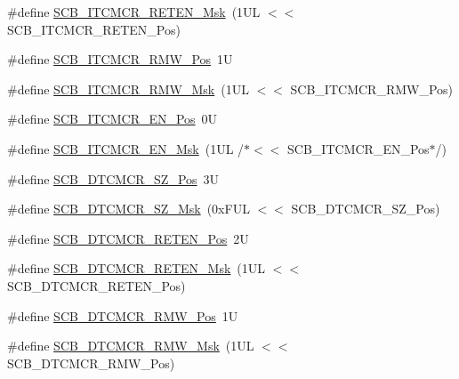 \begin{DoxyCompactItemize}
\item 
\#define \hyperlink{group___c_m_s_i_s___s_c_b_ga6f7d14ca4c78b7fd64157d9f8110f188}{S\-C\-B\-\_\-\-I\-T\-C\-M\-C\-R\-\_\-\-R\-E\-T\-E\-N\-\_\-\-Msk}~(1\-U\-L $<$$<$ S\-C\-B\-\_\-\-I\-T\-C\-M\-C\-R\-\_\-\-R\-E\-T\-E\-N\-\_\-\-Pos)
\item 
\#define \hyperlink{group___c_m_s_i_s___s_c_b_ga33901f7f35fe403c82a9641a0d35ae92}{S\-C\-B\-\_\-\-I\-T\-C\-M\-C\-R\-\_\-\-R\-M\-W\-\_\-\-Pos}~1\-U
\item 
\#define \hyperlink{group___c_m_s_i_s___s_c_b_ga0e3b9b0855837e95e4b0fc6d36cd604b}{S\-C\-B\-\_\-\-I\-T\-C\-M\-C\-R\-\_\-\-R\-M\-W\-\_\-\-Msk}~(1\-U\-L $<$$<$ S\-C\-B\-\_\-\-I\-T\-C\-M\-C\-R\-\_\-\-R\-M\-W\-\_\-\-Pos)
\item 
\#define \hyperlink{group___c_m_s_i_s___s_c_b_ga5d2fc7c04a8aaedff19bd4ff6de187eb}{S\-C\-B\-\_\-\-I\-T\-C\-M\-C\-R\-\_\-\-E\-N\-\_\-\-Pos}~0\-U
\item 
\#define \hyperlink{group___c_m_s_i_s___s_c_b_ga4d1c57f26a03910ab0549efecd2a602c}{S\-C\-B\-\_\-\-I\-T\-C\-M\-C\-R\-\_\-\-E\-N\-\_\-\-Msk}~(1\-U\-L /$\ast$$<$$<$ S\-C\-B\-\_\-\-I\-T\-C\-M\-C\-R\-\_\-\-E\-N\-\_\-\-Pos$\ast$/)
\item 
\#define \hyperlink{group___c_m_s_i_s___s_c_b_ga3cacd7498eb3c022ecc7e21a3dfc3c13}{S\-C\-B\-\_\-\-D\-T\-C\-M\-C\-R\-\_\-\-S\-Z\-\_\-\-Pos}~3\-U
\item 
\#define \hyperlink{group___c_m_s_i_s___s_c_b_ga35b381dd367cd1533f5c2b2c88720b72}{S\-C\-B\-\_\-\-D\-T\-C\-M\-C\-R\-\_\-\-S\-Z\-\_\-\-Msk}~(0x\-F\-U\-L $<$$<$ S\-C\-B\-\_\-\-D\-T\-C\-M\-C\-R\-\_\-\-S\-Z\-\_\-\-Pos)
\item 
\#define \hyperlink{group___c_m_s_i_s___s_c_b_ga8b72fb208ee772734e580911a8e522ce}{S\-C\-B\-\_\-\-D\-T\-C\-M\-C\-R\-\_\-\-R\-E\-T\-E\-N\-\_\-\-Pos}~2\-U
\item 
\#define \hyperlink{group___c_m_s_i_s___s_c_b_gaa69bbf5b17808383d88f23a424c1b62e}{S\-C\-B\-\_\-\-D\-T\-C\-M\-C\-R\-\_\-\-R\-E\-T\-E\-N\-\_\-\-Msk}~(1\-U\-L $<$$<$ S\-C\-B\-\_\-\-D\-T\-C\-M\-C\-R\-\_\-\-R\-E\-T\-E\-N\-\_\-\-Pos)
\item 
\#define \hyperlink{group___c_m_s_i_s___s_c_b_ga11c115ca21511be7e56e997a8bde567a}{S\-C\-B\-\_\-\-D\-T\-C\-M\-C\-R\-\_\-\-R\-M\-W\-\_\-\-Pos}~1\-U
\item 
\#define \hyperlink{group___c_m_s_i_s___s_c_b_ga79b099c3a4365b434aaf55ebbd534420}{S\-C\-B\-\_\-\-D\-T\-C\-M\-C\-R\-\_\-\-R\-M\-W\-\_\-\-Msk}~(1\-U\-L $<$$<$ S\-C\-B\-\_\-\-D\-T\-C\-M\-C\-R\-\_\-\-R\-M\-W\-\_\-\-Pos)
\item 
$$
\end{DoxyCompactItemize}
